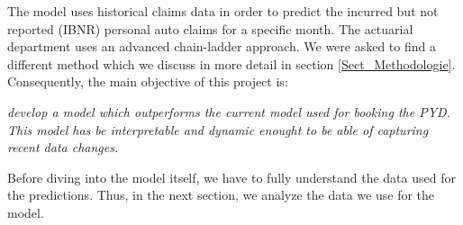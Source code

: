 The model uses historical claims data in order to predict the incurred but not reported (IBNR) personal auto claims for a specific month. The actuarial department uses an advanced chain-ladder approach. We were asked to find a different method which we discuss in more detail in section \ref{Sect_Methodologie}. Consequently, the main objective of this project is:
\begin{center}\emph{
		develop a model which outperforms the current model used for booking the PYD. This model has be interpretable and dynamic enought to be able of capturing recent data changes.
}\end{center}
Before diving into the model itself, we have to fully understand the data used for the predictions. Thus, in the next section, we analyze the data we use for the model.

 

	
	